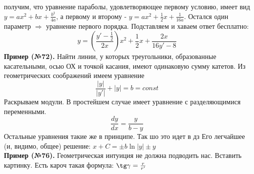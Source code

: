 получим, что уравнение параболы, удовлетворяющее первому условию, имеет вид 
$y=ax^2+bx+\frac{b^2}{4a}$, а первому и второму - $y=ax^2+\frac{1}{2}x+
\frac{1}{16a}$. Остался один параметр $\Rightarrow$ уравнение первого порядка. 
Подставляем и хаваем ответ бесплатно:
$$y=\left(\frac{y'-\frac{1}{2}}{2x}\right)x^2+\frac{1}{2}x+\frac{2x}{16y'-8}$$ 
\textbf{Пример (№72).} Найти линии, у которых треугольники, образованные 
касательными, осью ОХ и точкой касания, имеют одинаковую сумму катетов. 
Из геометрических соображений имеем уравнение 
$$\frac{|y|}{|y'|}+|y|=b=const$$ 
Раскрываем модули. В простейшем случае имеет уравнение с разделяющимися 
переменными. 
$$\frac{dy}{dx}=\frac{y}{b-y}$$ 
Остальные уравнения такие же в принципе. Так шо это идет в дз 
Его легчайшее (и, видимо, общее) решение: $x+C=\pm b\ln{|y|}\pm y$\\
\textbf{Пример (№76).} Геометрическая интуиция не должна подводить нас. 
Вставить картинку. Есть кароч такая формула: 
$\tg\gamma=\frac{r}{r'}$




